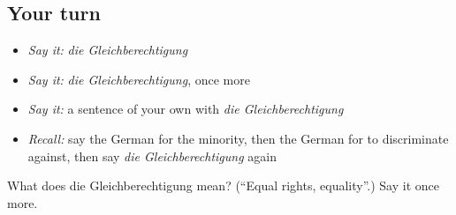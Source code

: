 \subsection*{Your turn}
\begin{itemize}
\raggedright
  \item \emph{Say it:} \emph{die Gleichberechtigung}
  \item \emph{Say it:} \emph{die Gleichberechtigung}, once more
  \item \emph{Say it:} a sentence of your own with \emph{die Gleichberechtigung}
  \item \emph{Recall:} say the German for the minority, then the German for to discriminate against, then say \emph{die Gleichberechtigung} again
\end{itemize}

\begin{tcolorbox}[breakable,colback=teal!4,colframe=teal!35!black,title={Before you move on}]
What does die Gleichberechtigung mean? (\textquotedblleft{}Equal rights, equality\textquotedblright{}.) Say it once more.
\end{tcolorbox}
